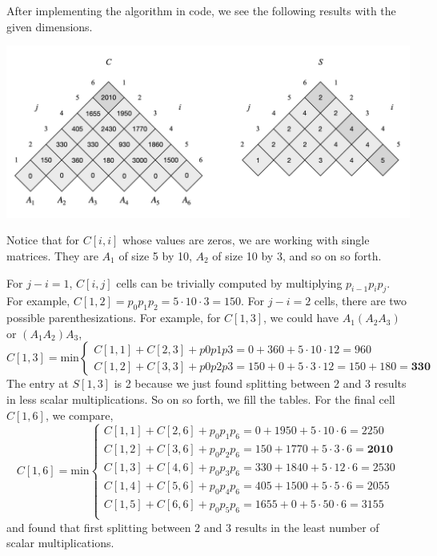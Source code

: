 \documentclass[11pt]{article}
\theoremstyle{definition}
\theoremstyle{theorem}
\begin{document}
 After implementing the algorithm in code, we see the following results with the given dimensions.
  
\includegraphics[scale=0.65]{hw5q1.png}

Notice that for $C[i, i]$ whose values are zeros, we are working with single matrices. They are $A_1$ of size 5 by 10, $A_2$ of size 10 by 3, and so on so forth. 

For $j - i = 1$, $C[i, j]$ cells can be trivially computed by multiplying $p_{i-1}p_ip_j$. For example, $C[1, 2] = p_0p_1p_2 = 5 \cdot 10 \cdot 3 = 150$. For $j - i = 2$ cells, there are two possible parenthesizations. For example, for $C[1, 3]$, we could have $A_1(A_2A_3)$ or $(A_1A_2)A_3$,
\[
C[1,3] = \text{min}
\begin{cases}
	C[1, 1] + C[2, 3] + p0p1p3= 0+360+5 \cdot 10 \cdot 12 =  960 \\
    	C[1, 2] + C[3, 3] + p0p2p3=150+0+5 \cdot 3 \cdot 12=150+180= \textbf{330}
\end{cases}
\]
The entry at $S[1, 3]$ is 2 because we just found splitting between 2 and 3 results in less scalar multiplications. So on so forth, we fill the tables. For the final cell $C[1, 6]$, we compare,
\[
C[1, 6] = \text{min}
\begin{cases}
	C[1, 1] + C[2, 6] + p_0p_1p_6 = 0 + 1950 + 5 \cdot 10 \cdot 6 = 2250 \\
	C[1, 2] + C[3, 6] + p_0p_2p_6 = 150 + 1770 + 5 \cdot 3 \cdot 6 = \textbf{2010} \\
	C[1, 3] + C[4, 6] + p_0p_3p_6 = 330 + 1840 + 5 \cdot 12 \cdot 6 = 2530 \\
	C[1, 4] + C[5, 6] + p_0p_4p_6 = 405 + 1500 + 5 \cdot 5 \cdot 6 = 2055 \\
	C[1, 5] + C[6, 6] + p_0p_5p_6 = 1655 + 0 + 5 \cdot 50 \cdot 6 = 3155 \\
\end{cases}
\]
and found that first splitting between 2 and 3 results in the least number of scalar multiplications.
\end{document}
